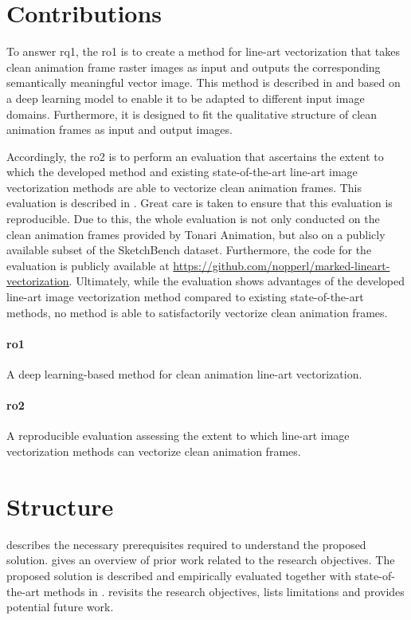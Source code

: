 \section{Contributions}
\label{sec:intro.goals}

To answer \gls{rq1}, the \gls{ro1} is to create a method for line-art vectorization that takes clean animation frame raster images as input and outputs the corresponding semantically meaningful vector image. This method is described in  and based on a deep learning model to enable it to be adapted to different input image domains. Furthermore, it is designed to fit the qualitative structure of clean animation frames as input and output images. 

Accordingly, the \gls{ro2} is to perform an evaluation that ascertains the extent to which the developed method and existing state-of-the-art line-art image vectorization methods are able to vectorize clean animation frames. This evaluation is described in . Great care is taken to ensure that this evaluation is reproducible. Due to this, the whole evaluation is not only conducted on the clean animation frames provided by Tonari Animation, but also on a publicly available subset of the SketchBench \citep{Yan:2020:ABR} dataset. Furthermore, the code for the evaluation is publicly available at \url{https://github.com/nopperl/marked-lineart-vectorization}. Ultimately, while the evaluation shows advantages of the developed line-art image vectorization method compared to existing state-of-the-art methods, no method is able to satisfactorily vectorize clean animation frames.

\paragraph{\gls{ro1}} A deep learning-based method for clean animation line-art vectorization.
\paragraph{\gls{ro2}} A reproducible evaluation assessing the extent to which line-art image vectorization methods can vectorize clean animation frames.

\section{Structure}
\label{sec:intro.structure}

 describes the necessary prerequisites required to understand the proposed solution.  gives an overview of prior work related to the research objectives. The proposed solution is described and empirically evaluated together with state-of-the-art methods in .  revisits the research objectives, lists limitations and provides potential future work.
